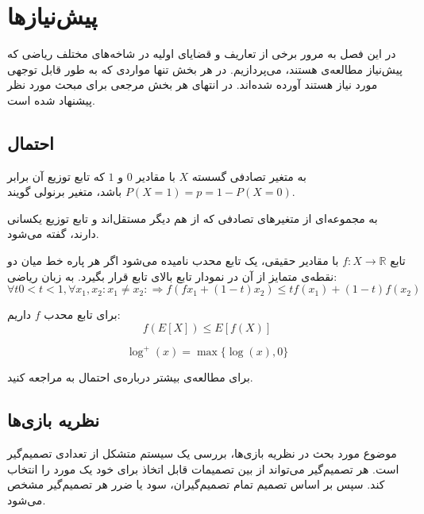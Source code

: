 \chapter{پیش‌نیازها}
\label{chapter:preliminaries}
در این فصل به مرور برخی از تعاریف و قضایای اولیه در شاخه‌های مختلف ریاضی که پیش‌نیاز مطالعه‌ی \picod هستند، می‌پردازیم. در هر بخش تنها مواردی که به طور قابل توجهی‌ مورد نیاز هستند آورده شده‌اند. در انتهای هر بخش مرجعی برای مبحث مورد نظر پیشنهاد شده است.
\section{احتمال}
\begin{definition}
	به متغیر تصادفی گسسته
	$X$
	با مقادیر
	$0$
	و
	$1$
	که تابع توزیع آن برابر
	$P(X = 1) = p = 1 - P(X = 0)$
	باشد، متغیر برنولی گویند.
\end{definition}
\begin{definition}
به مجموعه‌ای از متغیرهای تصادفی که از هم دیگر مستقل‌‌اند و تابع توزیع یکسانی دارند، گفته می‌شود.
\end{definition}
\begin{definition}
	تابع
	$f: X \rightarrow \mathbb{R}$
	با مقادیر حقیقی، یک تابع محدب نامیده می‌شود اگر هر پاره خط میان دو نقطه‌ی متمایز از آن در نمودار تابع بالای تابع قرار بگیرد. به زبان ریاضی:
	$$\forall t 0 < t < 1, \forall x_1, x_2: x_1 \ne x_2: \Rightarrow f(f x_1 + (1 - t) x_2) \leq tf(x_1) + (1 - t) f(x_2)$$
\end{definition}
\begin{theorem}
	\label{Jensen}
	برای تابع محدب
	$f$
	داریم:
	$$f(E[X]) \leq E[f(X)]$$
\end{theorem}
\begin{notation}[$\log^{+}$]
	$$\log^{+}(x) = \max\{\log(x), 0\}$$
\end{notation}
برای مطالعه‌ی بیشتر درباره‌ی احتمال به
\cite{book:pro}
مراجعه کنید.
\section{نظریه بازی‌ها}
موضوع مورد بحث در نظریه بازی‌ها، بررسی یک سیستم متشکل از تعدادی تصمیم‌گیر است. هر تصمیم‌گیر می‌تواند از بین تصمیمات قابل اتخاذ برای خود یک مورد را انتخاب کند. سپس بر اساس تصمیم تمام تصمیم‌گیران، سود یا ضرر هر تصمیم‌گیر مشخص می‌شود.

